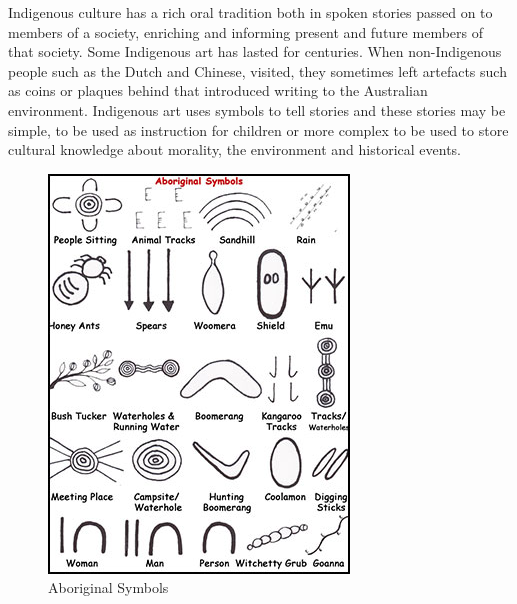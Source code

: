 Indigenous culture has a rich oral tradition both in spoken stories passed on to members of a society, enriching and informing present and future members of that society. Some Indigenous art has lasted for centuries.
When non-Indigenous people such as the Dutch and Chinese, visited, they sometimes left artefacts such as coins or plaques behind that introduced writing to the Australian environment. Indigenous art uses symbols to tell stories\cite{IndigenousArtPurpose} and these stories may be simple, to be used as instruction for children or more complex to be used to store cultural knowledge about morality, the environment and historical events.
\begin{figure}[ht]
\centering
\includegraphics[scale=0.75]{figures/Artlandish-aboriginal-art-gallery-Symbols2.jpg}
\caption{Aboriginal Symbols\cite{IndigenousArtPurpose}}
\end{figure}



